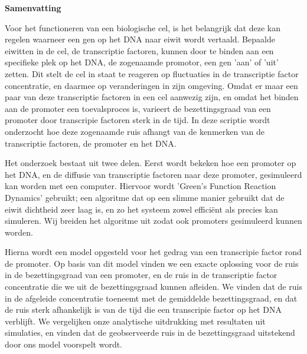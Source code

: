 \begin{center}
{\center \bf Samenvatting}
\end{center}

Voor het functioneren van een biologische cel, is het belangrijk dat deze kan regelen waarneer een gen op het DNA naar eiwit wordt vertaald. Bepaalde eiwitten in de cel, de transcriptie factoren, kunnen door te binden aan een specifieke plek op het DNA, de zogenaamde promotor, een gen 'aan' of 'uit' zetten. Dit stelt de cel in staat te reageren op fluctuaties in de transcriptie factor concentratie, en daarmee op veranderingen in zijn omgeving. Omdat er maar een paar van deze transcriptie factoren in een cel aanwezig zijn, en omdat het binden aan de promoter een toevalsproces is, varieert de bezettingsgraad van een promoter door transcripie factoren sterk in de tijd. In deze scriptie wordt onderzocht hoe deze zogenaamde ruis afhangt van de kenmerken van de transcriptie factoren, de promoter en het DNA. 

Het onderzoek bestaat uit twee delen. Eerst wordt bekeken hoe een promoter op het DNA, en de diffusie van transcriptie factoren naar deze promoter, gesimuleerd kan worden met een computer. Hiervoor wordt 'Green's Function Reaction Dynamics' gebruikt; een algoritme dat op een slimme manier gebruikt dat de eiwit dichtheid zeer laag is, en zo het systeem zowel effici\"ent als precies kan simuleren. Wij breiden het algoritme uit zodat ook promoters gesimuleerd kunnen worden.

Hierna wordt een model opgesteld voor het gedrag van een transcripie factor rond de promoter. Op basis van dit model vinden we een exacte oplossing voor de ruis in de bezettingsgraad van een promoter, en de ruis in de transcriptie factor concentratie die we uit de bezettingsgraad kunnen afleiden. We vinden dat de ruis in de afgeleide concentratie toeneemt met de gemiddelde bezettingsgraad, en dat de ruis sterk afhankelijk is van de tijd die een transcripie factor op het DNA verblijft. We vergelijken onze analytische uitdrukking met resultaten uit simulaties, en vinden dat de geobserveerde ruis in de bezettingsgraad uitstekend door ons model voorspelt wordt.